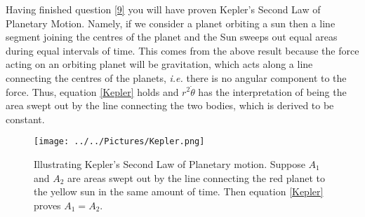 \documentclass[]{article}
\newcommand{\eqn}[1]{equation \eqref{#1}}
\newcommand{\ie}{\emph{i.e.} }
\newcommand{\ttp}{.45\textwidth}
\begin{document}
Having finished question \ref{9} you will have proven Kepler's Second Law of Planetary Motion. Namely, if we consider a planet orbiting a sun then a line segment joining the centres of the planet and the Sun sweeps out equal areas during equal intervals of time. This comes from the above result because the force acting on an orbiting planet will be gravitation, which acts along a line connecting the centres of the planets, \ie there is no angular component to the force. Thus, \eqn{Kepler} holds and $r^2\dot{\theta}$ has the interpretation of being the area swept out by the line connecting the two bodies, which is derived to be constant.
\begin{figure}[h!!!tb]
\centering
\texttt{[image: ../../Pictures/Kepler.png]}
\caption{\label{Kepler_law} Illustrating Kepler's Second Law of Planetary motion. Suppose $A_1$ and $A_2$ are areas swept out by the line connecting the red planet to the yellow sun in the same amount of time. Then \eqn{Kepler} proves $A_1=A_2$.}
\end{figure}
\end{document}

